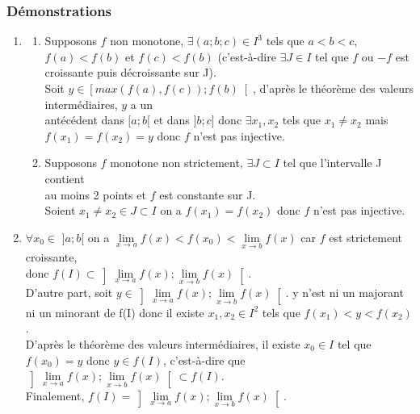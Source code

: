 \documentclass[a4paper,10pt]{book} %
\newcommand{\tvi}{théorème des valeurs intermédiaires}
\begin{document}
\subsubsection{Démonstrations}
\begin{enumerate} \item
\begin{enumerate}
\item Supposons $f$ non monotone, $\exists (a;b;c) \in I^{3}$ tels que $a<b<c$, $f(a)<f(b)$ et
$f(c)<f(b)$ (c'est-à-dire $\exists J\in I$ tel que $f$ ou $-f$ est croissante puis décroissante sur J).\\

Soit $y\in \left[max(f(a),f(c));f(b)\right[$, d'après le \tvi, $y$ a un\\
antécédent dans $[a;b[$ et dans $]b;c]$ donc $\exists x_{1},x_{2}$ tels que $x_{1}\neq x_{2}$ mais $f(x_{1})=f(x_{2})=y$ donc $f$ n'est pas injective.\\

\item Supposons $f$ monotone non strictement, $\exists J\subset I$ tel que l'intervalle J contient\\
au moins 2 points et $f$ est constante sur J.\\

Soient $x_{1}\neq x_{2} \in J\subset I$ on a $f(x_{1})=f(x_{2})$ donc $f$ n'est pas injective.\\ \end{enumerate}

\item $\forall x_{0} \in$ $]a;b[$ on a $\lim\limits_{x\rightarrow a}f(x)<f(x_{0})<\lim\limits_{x\rightarrow b}f(x)$ car $f$ est strictement croissante,\\
donc $f(I)\subset \left]\lim\limits_{x\rightarrow a}f(x) ; \lim\limits_{x\rightarrow b}f(x) \right[$.\\

D'autre part, soit $y\in \left]\lim\limits_{x\rightarrow a}f(x) ; \lim\limits_{x\rightarrow b}f(x) \right[$. y n'est ni un majorant ni un minorant de f(I) donc il existe $x_{1},x_{2}\in I^{2}$ tels que 
$f(x_{1})<y<f(x_{2})$.\\

D'après le \tvi, il existe $x_{0} \in I$ tel que $f(x_{0})=y$ donc $y\in f(I)$, c'est-à-dire que $\left]\lim\limits_{x\rightarrow a}f(x) ; \lim\limits_{x\rightarrow b}f(x) \right[\subset f(I)$.\\

Finalement, $f(I)=\left]\lim\limits_{x\rightarrow a}f(x) ; \lim\limits_{x\rightarrow b}f(x) \right[$.\\


\end{enumerate}
\end{document}
